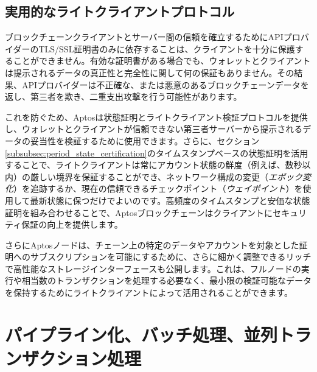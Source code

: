 \documentclass{article}
\begin{document}
\subsection{実用的なライトクライアントプロトコル}
\label{practical_light_client_protocols}

ブロックチェーンクライアントとサーバー間の信頼を確立するためにAPIプロバイダーのTLS/SSL証明書のみに依存することは、クライアントを十分に保護することができません。有効な証明書がある場合でも、ウォレットとクライアントは提示されるデータの真正性と完全性に関して何の保証もありません。その結果、APIプロバイダーは不正確な、または悪意のあるブロックチェーンデータを返し、第三者を欺き、二重支出攻撃を行う可能性があります。

これを防ぐため、Aptosは状態証明とライトクライアント検証プロトコルを提供し、ウォレットとクライアントが信頼できない第三者サーバーから提示されるデータの妥当性を検証するために使用できます。さらに、セクション\ref{subsubsec:period_state_certification}のタイムスタンプベースの状態証明を活用することで、ライトクライアントは常にアカウント状態の鮮度（例えば、数秒以内）の厳しい境界を保証することができ、ネットワーク構成の変更（\emph{エポック変化}）を追跡するか、現在の信頼できるチェックポイント（\emph{ウェイポイント}）を使用して最新状態に保つだけでよいのです\cite{waypoints}。高頻度のタイムスタンプと安価な状態証明を組み合わせることで、Aptosブロックチェーンはクライアントにセキュリティ保証の向上を提供します。

さらにAptosノードは、チェーン上の特定のデータやアカウントを対象とした証明へのサブスクリプションを可能にするために、さらに細かく調整できるリッチで高性能なストレージインターフェースも公開します。これは、フルノードの実行や相当数のトランザクションを処理する必要なく、最小限の検証可能なデータを保持するためにライトクライアントによって活用されることができます。

\section{パイプライン化、バッチ処理、並列トランザクション処理}
\label{sec:pipelining_batching}
\end{document}
